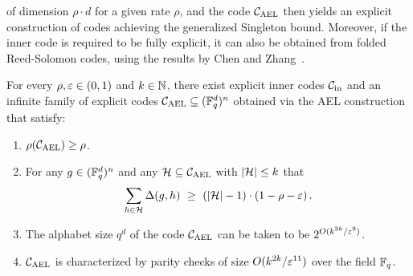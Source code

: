 of dimension $\rho \cdot d$ for a given rate $\rho$, and the code ${ {\mathcal C}_{\mathrm{AEL}} }$ then yields an explicit
construction of codes achieving the generalized Singleton bound.
%
Moreover, if the inner code is required to be fully explicit, it can also be obtained from folded Reed-Solomon codes, using the results by Chen and Zhang~\cite{CZ24}.
%
\begin{corollary}\label{cor:ael_instantiation}
For every $\rho, \varepsilon \in (0,1)$ and $k \in {\mathbb{N}}$, there exist explicit inner codes ${\mathcal C}_{\mathrm{in}}$ and an infinite family of explicit codes ${ {\mathcal C}_{\mathrm{AEL}} } \subseteq ({\mathbb F}_q^d)^n$ obtained via the AEL construction that satisfy: 
\begin{enumerate}
\item $\rho({ {\mathcal C}_{\mathrm{AEL}} }) \geq \rho$.
\item For any $g \in  ({\mathbb F}_q^d)^n$ and any ${\mathcal H} \subseteq { {\mathcal C}_{\mathrm{AEL}} }$ with $\lvert{\mathcal H}\rvert \leq k$ that
\[
\sum_{h \in {\mathcal H}} \Delta(g,h) ~\geq~ (\lvert{\mathcal H}\rvert-1) \cdot (1 - \rho - \varepsilon) \,.
\]
\item The alphabet size $q^d$ of the code ${ {\mathcal C}_{\mathrm{AEL}} }$ can be taken to be $2^{O(k^{3k}/\varepsilon^9)}$.
\item ${ {\mathcal C}_{\mathrm{AEL}} }$ is characterized by parity checks of size $O(k^{2k}/\varepsilon^{11})$ over the field ${\mathbb F}_q$.
\end{enumerate}
\end{corollary}
% 
